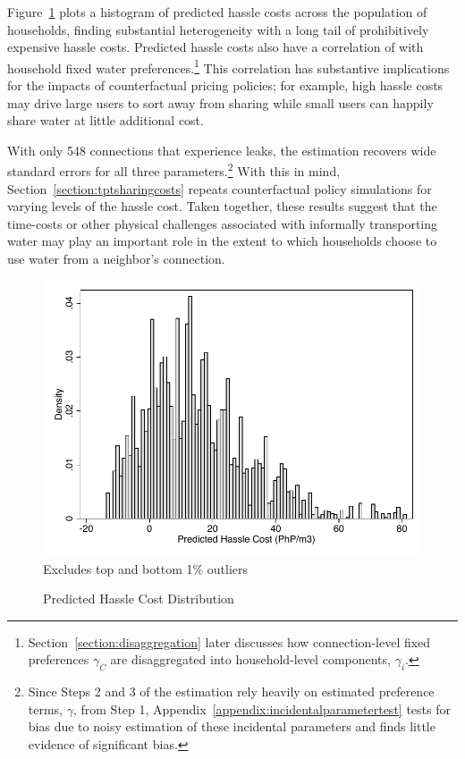 \documentclass[12pt]{article}
\begin{document}
Figure~\ref{figure:step2histogram} plots a histogram of predicted hassle costs across the population of households, finding substantial heterogeneity with a long tail of prohibitively expensive hassle costs.  Predicted hassle costs also have a correlation of with household fixed water preferences.\footnote{Section~\ref{section:disaggregation} later discusses how connection-level fixed preferences $\gamma_C$ are disaggregated into household-level components, $\gamma_i$.}  This correlation has substantive implications for the impacts of counterfactual pricing policies; for example, high hassle costs may drive large users to sort away from sharing while small users can happily share water at little additional cost.

With only 548 connections that experience leaks, the estimation recovers wide standard errors for all three parameters.\footnote{Since Steps 2 and 3 of the estimation rely heavily on estimated preference terms, $\gamma$, from Step 1, Appendix~\ref{appendix:incidentalparametertest} tests for bias due to noisy estimation of these incidental parameters and finds little evidence of significant bias.}  With this in mind, Section~\ref{section:tptsharingcosts} repeats counterfactual policy simulations for varying levels of the hassle cost.  Taken together, these results suggest that the time-costs or other physical challenges associated with informally transporting water may play an important role in the extent to which households choose to use water from a neighbor's connection.


\begin{figure}
\centering
\caption{Predicted Hassle Cost Distribution}\label{figure:step2histogram}
\includegraphics[scale=.7]{tables/hassle_cost_distribution.pdf} \\
\footnotesize{Excludes top and bottom 1\% outliers}
\end{figure}
\end{document}
